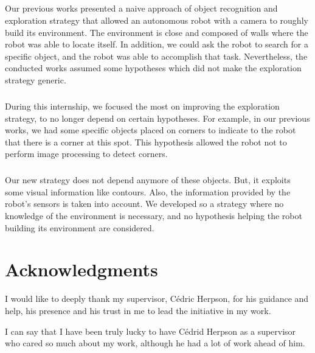 \documentclass[12pt]{report}
\begin{document}
	\paragraph{}
	Our previous works presented a naive approach of object recognition and exploration strategy that allowed an autonomous robot with a camera to roughly build its environment. The environment is close and composed of walls where the robot was able to locate itself. In addition, we could ask the robot to search for a specific object, and the robot was able to accomplish that task. Nevertheless, the conducted works assumed some hypotheses which did not make the exploration strategy generic.
		
	\paragraph{}
	During this internship, we focused the most on improving the exploration strategy, to no longer depend on certain hypotheses. For example, in our previous works, we had some specific objects placed on corners to indicate to the robot that there is a corner at this spot. This hypothesis allowed the robot not to perform image processing to detect corners. 
	
	\paragraph{}
	Our new strategy does not depend anymore of these objects. But, it exploits some visual information like contours. Also, the information provided by the robot's sensors is taken into account. We developed so a strategy where no knowledge of the environment is necessary, and no hypothesis helping the robot building its environment are considered.
	
	\chapter{Acknowledgments}

	\begin{center}
		
	
	I would like to deeply thank my supervisor, Cédric Herpson, for his guidance and help, his presence and his trust in me to lead the initiative in my work. 
	
	I can say that I have been truly lucky to have Cédrid Herpson as a supervisor who cared so much about my work, although he had a lot of work ahead of him. 
	\end{center}
	
\end{document}
